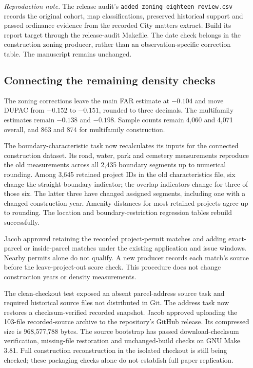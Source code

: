 \textit{Reproduction note.} The release audit's \texttt{added\_zoning\_eighteen\_review.csv} records the original cohort, map classifications, preserved historical support and passed ordinance evidence from the recorded City matters extract. Build its report target through the release-audit Makefile. The date check belongs in the construction zoning producer, rather than an observation-specific correction table. The manuscript remains unchanged.

\subsection*{Connecting the remaining density checks}
The zoning corrections leave the main FAR estimate at $-0.104$ and move DUPAC from $-0.152$ to $-0.151$, rounded to three decimals. The multifamily estimates remain $-0.138$ and $-0.198$. Sample counts remain 4,060 and 4,071 overall, and 863 and 874 for multifamily construction.

The boundary-characteristic task now recalculates its inputs for the connected construction dataset. Its road, water, park and cemetery measurements reproduce the old measurements across all 2,435 boundary segments up to numerical rounding. Among 3,645 retained project IDs in the old characteristics file, six change the straight-boundary indicator; the overlap indicators change for three of those six. The latter three have changed assigned segments, including one with a changed construction year. Amenity distances for most retained projects agree up to rounding. The location and boundary-restriction regression tables rebuild successfully.

Jacob approved retaining the recorded project-permit matches and adding exact-parcel or inside-parcel matches under the existing application and issue windows. Nearby permits alone do not qualify. A new producer records each match's source before the leave-project-out score check. This procedure does not change construction years or density measurements.

The clean-checkout test exposed an absent parcel-address source task and required historical source files not distributed in Git. The address task now restores a checksum-verified recorded snapshot. Jacob approved uploading the 103-file recorded-source archive to the repository's GitHub release. Its compressed size is 968,577,788 bytes. The source bootstrap has passed download-checksum verification, missing-file restoration and unchanged-build checks on GNU Make 3.81. Full construction reconstruction in the isolated checkout is still being checked; these packaging checks alone do not establish full paper replication.

